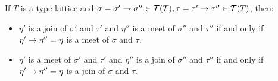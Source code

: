 \documentclass[main.tex]{subfiles}
\begin{document}
\begin{lemma}
    \label{lemma:complexmeet}
    If $T$ is a type lattice and $\sigma = \sigma' \rightarrow \sigma'' \in \mathcal{T}( T ),
    \tau = \tau' \rightarrow \tau'' \in \mathcal{T}( T )$,
    then:
    \begin{itemize}
        \item $\eta'$ is a join of $\sigma'$ and $\tau'$ and
            $\eta''$ is a meet of $\sigma''$ and $\tau''$ if and only if
            $\eta' \rightarrow \eta'' = \eta$ is a meet of $\sigma$ and $\tau$.
        \item $\eta'$ is a meet of $\sigma'$ and $\tau'$ and
            $\eta''$ is a join of $\sigma''$ and $\tau''$ if and only if
            $\eta' \rightarrow \eta'' = \eta$ is a join of $\sigma$ and $\tau$.
    \end{itemize}
\end{lemma}
\end{document}
